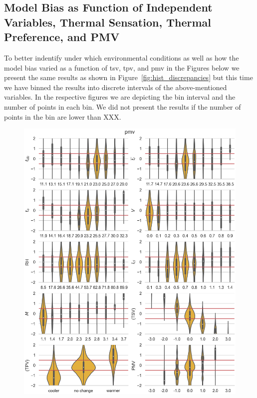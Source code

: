 \subsection{Model Bias as Function of Independent Variables, Thermal Sensation, Thermal Preference, and PMV}\label{subsec:model-bias-variable}
To better indentify under which environmental conditions as well as how the model bias varied as a function of \ac{tsv}, \ac{tpv}, and \ac{pmv} in the Figures below we present the same results as shown in Figure~\ref{fig:hist_discrepancies} but this time we have binned the results into discrete intervals of the above-mentioned variables.
In the respective figures we are depicting the bin interval and the number of points in each bin.
We did not present the results if the number of points in the bin are lower than XXX.

\begin{figure}[htb!]
    \centering
    \includegraphics[width=\textwidth]{figures/bias_pmv}
    \caption{}
    \label{fig:bias_pmv}
\end{figure}

